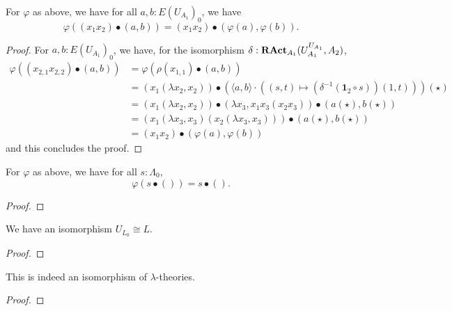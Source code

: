 \begin{lemma}
  For $ \varphi $ as above, we have for all $ a, b: E(U_{A_1})_0 $, we have
  \[ \varphi((x_1 x_2) \bullet (a, b)) = (x_1 x_2) \bullet (\varphi(a), \varphi(b)). \]
\end{lemma}
\begin{proof}
  For $ a, b: E(U_{A_1})_0 $, we have, for the isomorphism $ \delta: \mathbf{RAct}_{A_1}(U_{A_1}^{U_{A_1}}, A_2) $,
  \begin{align*}
    \varphi((x_{2, 1} x_{2, 2}) \bullet (a, b)) &= \varphi(\rho(x_{1, 1}) \bullet (a, b))\\
    &= (x_1 (\lambda x_2, x_2)) \bullet (\langle a, b \rangle \cdot ((s, t) \mapsto (\delta^{-1}(\mathbf 1_2 \circ s)) (1, t)))(\star)\\
    &= (x_1 (\lambda x_2, x_2)) \bullet (\lambda x_3, x_1 x_3 (x_2 x_3)) \bullet (a(\star), b(\star))\\
    &= (x_1 (\lambda x_3, x_3) (x_2 (\lambda x_3, x_3))) \bullet (a(\star), b(\star))\\
    &= (x_1 x_2) \bullet (\varphi(a), \varphi(b))
  \end{align*}
  and this concludes the proof.
\end{proof}

\begin{lemma}
  For $ \varphi $ as above, we have for all $ s: \Lambda_0 $,
  \[ \varphi(s \bullet ()) = s \bullet (). \]
\end{lemma}
\begin{proof}
  \TODO
\end{proof}

\begin{lemma}
  We have an isomorphism $ U_{L_0} \cong L $.
\end{lemma}
\begin{proof}
  \TODO
\end{proof}

\begin{lemma}
  This is indeed an isomorphism of $ \lambda $-theories.
\end{lemma}
\begin{proof}
  \TODO
\end{proof}

